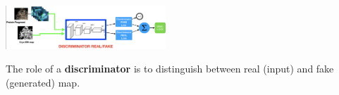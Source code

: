         \begin{tikzfigure}
           \includegraphics[width=0.45\textwidth]{gan.png}
        \end{tikzfigure}
The role of a \textbf{discriminator} is to distinguish between real (input) and fake (generated) map.